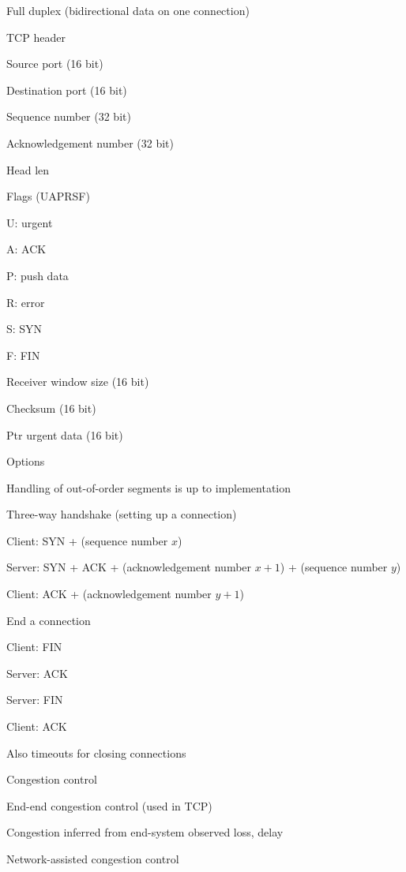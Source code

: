 		\item Full duplex (bidirectional data on one connection)
		\item TCP header
		\enumstart
			\item Source port (16 bit)
			\item Destination port (16 bit)
			\item Sequence number (32 bit)
			\item Acknowledgement number (32 bit)
			\item Head len
			\item Flags (UAPRSF)
			\enumstart
				\item U: urgent
				\item A: ACK
				\item P: push data
				\item R: error
				\item S: SYN
				\item F: FIN
			\enumend
			\item Receiver window size (16 bit)
			\item Checksum (16 bit)
			\item Ptr urgent data (16 bit)
			\item Options
		\enumend
		\item Handling of out-of-order segments is up to implementation
		\item Three-way handshake (setting up a connection)
		\enumstart
			\item Client: SYN + (sequence number $x$)
			\item Server: SYN + ACK + (acknowledgement number $x+1$) + (sequence number $y$)
			\item Client: ACK + (acknowledgement number $y+1$)
		\enumend
		\item End a connection
		\enumstart
			\item Client: FIN
			\item Server: ACK
			\item Server: FIN
			\item Client: ACK
		\enumend
		\item Also timeouts for closing connections
	\enumend
	\item Congestion control
	\enumstart
		\item End-end congestion control (used in TCP)
		 \enumstart
		 	\item Congestion inferred from end-system observed loss, delay
		 \enumend
		\item Network-assisted congestion control
